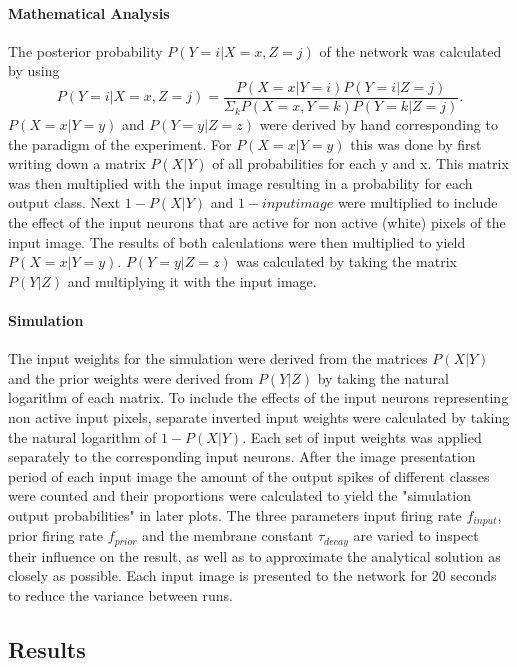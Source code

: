 \paragraph{Mathematical Analysis}
The posterior probability $P(Y = i|X = x, Z = j)$ of the network was calculated by using
\begin{equation}
\label{eqn:pXvorausgesetztY}
P(Y = i|X = x, Z = j) = \frac{P(X=x|Y=i)P(Y = i|Z = j)}{\Sigma_{k}P(X=x,Y=k)P(Y=k|Z=j)}.
\end{equation}
$P(X=x|Y=y)$ and $P(Y=y|Z=z)$ were derived by hand corresponding to the paradigm of the experiment. For $P(X=x|Y=y)$ this was done by first writing down a matrix $P(X|Y)$ of all probabilities for each y and x. This matrix was then multiplied with the input image resulting in a probability for each output class. Next $1 - P(X|Y)$ and $1 - input image$ were multiplied to include the effect of the input neurons that are active for non active (white) pixels of the input image. The results of both calculations were then multiplied to yield $P(X=x|Y=y)$.
$P(Y=y|Z=z)$ was calculated by taking the matrix $P(Y|Z)$ and multiplying it with the input image.

\paragraph{Simulation}
The input weights for the simulation were derived from the matrices $P(X|Y)$ and the prior weights were derived from $P(Y|Z)$ by taking the natural logarithm of each matrix. To include the effects of the input neurons representing non active input pixels, separate inverted input weights were calculated by taking the natural logarithm of $1-P(X|Y)$. Each set of input weights was applied separately to the corresponding input neurons.
After the image presentation period of each input image the amount of the output spikes of different classes were counted and their proportions were calculated to yield the "simulation output probabilities" in later plots. The three parameters input firing rate $f_{input}$, prior firing rate $f_{prior}$ and the membrane constant $\tau_{decay}$ are varied to inspect their influence on the result, as well as to approximate the analytical solution as closely as possible. Each input image is presented to the network for 20 seconds to reduce the variance between runs.

\subsection{Results}

